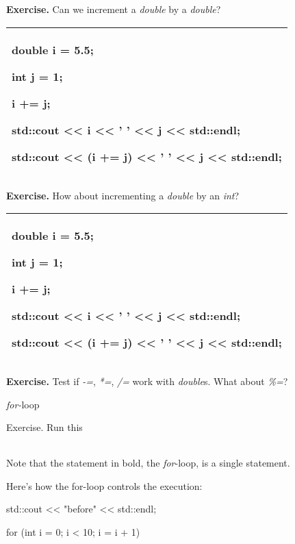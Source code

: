 \documentclass[
]{article}
\begin{document}
\textbf{Exercise.} Can we increment a \emph{double} by a \emph{double}?

\begin{longtable}[]{@{}l@{}}
\toprule
\endhead
\begin{minipage}[t]{0.97\columnwidth}\raggedright
double i = 5.5;

int j = 1;

i += j;

std::cout \textless\textless{} i \textless\textless{} ' '
\textless\textless{} j \textless\textless{} std::endl;

std::cout \textless\textless{} (i += j) \textless\textless{} ' '
\textless\textless{} j \textless\textless{} std::endl;\strut
\end{minipage}\tabularnewline
\bottomrule
\end{longtable}

\textbf{Exercise.} How about incrementing a \emph{double} by an
\emph{int}?

\begin{longtable}[]{@{}l@{}}
\toprule
\endhead
\begin{minipage}[t]{0.97\columnwidth}\raggedright
double i = 5.5;

int j = 1;

i += j;

std::cout \textless\textless{} i \textless\textless{} ' '
\textless\textless{} j \textless\textless{} std::endl;

std::cout \textless\textless{} (i += j) \textless\textless{} ' '
\textless\textless{} j \textless\textless{} std::endl;\strut
\end{minipage}\tabularnewline
\bottomrule
\end{longtable}

\textbf{Exercise.} Test if \emph{-=}, \emph{*=}, \emph{/=} work with
\emph{double}s. What about \emph{\%=}?

\emph{for-}loop

Exercise. Run this

\begin{longtable}[]{@{}@{}}
\toprule
\endhead
\bottomrule
\end{longtable}

Note that the statement in bold, the \emph{for}-loop, is a single
statement.

Here's how the for-loop controls the execution:

std::cout \textless\textless{} "before" \textless\textless{} std::endl;

for (int i = 0; i \textless{} 10; i = i + 1)
\end{document}
